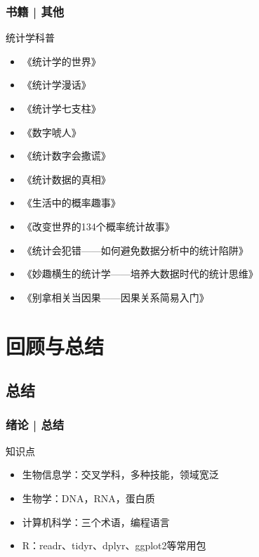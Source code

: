 \begin{frame}
  \frametitle{书籍 | 其他}
    \begin{block}{统计学科普}
      \begin{itemize}
      \item 《统计学的世界》
      \item 《统计学漫话》
      \item 《统计学七支柱》
      \item 《数字唬人》
      \item 《统计数字会撒谎》
      \item 《统计数据的真相》
      \item 《生活中的概率趣事》
      \item 《改变世界的134个概率统计故事》
      \item 《统计会犯错——如何避免数据分析中的统计陷阱》
      \item 《妙趣横生的统计学——培养大数据时代的统计思维》
      \item 《别拿相关当因果——因果关系简易入门》
      \end{itemize}
    \end{block}
\end{frame}

\section{回顾与总结}
\subsection{总结}
\begin{frame}
  \frametitle{绪论 | 总结}
  \begin{block}{知识点}
    \begin{itemize}
      \item 生物信息学：交叉学科，多种技能，领域宽泛
      \item 生物学：DNA，RNA，蛋白质
      \item 计算机科学：三个术语，编程语言
      \item R：readr、tidyr、dplyr、ggplot2等常用包
    \end{itemize}
  \end{block}
\end{frame}

